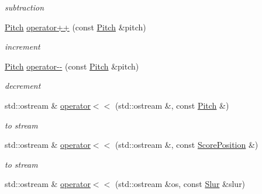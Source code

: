 \begin{DoxyCompactItemize}
\begin{DoxyCompactList}\small\item\em subtraction \end{DoxyCompactList}\item 
\hypertarget{namespacesinsy_af7621892422c95de02c6f11a01417ebd}{\hyperlink{classsinsy_1_1Pitch}{\-Pitch} \hyperlink{namespacesinsy_af7621892422c95de02c6f11a01417ebd}{operator++} (const \hyperlink{classsinsy_1_1Pitch}{\-Pitch} \&pitch)}\label{namespacesinsy_af7621892422c95de02c6f11a01417ebd}

\begin{DoxyCompactList}\small\item\em increment \end{DoxyCompactList}\item 
\hypertarget{namespacesinsy_a11990db2d25e8464b1382d470e520950}{\hyperlink{classsinsy_1_1Pitch}{\-Pitch} \hyperlink{namespacesinsy_a11990db2d25e8464b1382d470e520950}{operator-\/-\/} (const \hyperlink{classsinsy_1_1Pitch}{\-Pitch} \&pitch)}\label{namespacesinsy_a11990db2d25e8464b1382d470e520950}

\begin{DoxyCompactList}\small\item\em decrement \end{DoxyCompactList}\item 
\hypertarget{namespacesinsy_a971044ff94a29b43d5528dc2eff2e428}{std\-::ostream \& \hyperlink{namespacesinsy_a971044ff94a29b43d5528dc2eff2e428}{operator$<$$<$} (std\-::ostream \&, const \hyperlink{classsinsy_1_1Pitch}{\-Pitch} \&)}\label{namespacesinsy_a971044ff94a29b43d5528dc2eff2e428}

\begin{DoxyCompactList}\small\item\em to stream \end{DoxyCompactList}\item 
\hypertarget{namespacesinsy_a9a6f6bb3cd69764bae2883df0471742d}{std\-::ostream \& \hyperlink{namespacesinsy_a9a6f6bb3cd69764bae2883df0471742d}{operator$<$$<$} (std\-::ostream \&, const \hyperlink{classsinsy_1_1ScorePosition}{\-Score\-Position} \&)}\label{namespacesinsy_a9a6f6bb3cd69764bae2883df0471742d}

\begin{DoxyCompactList}\small\item\em to stream \end{DoxyCompactList}\item 
\hypertarget{namespacesinsy_ad5f6efd215c950a8c02c5a2dcbfe06f2}{std\-::ostream \& \hyperlink{namespacesinsy_ad5f6efd215c950a8c02c5a2dcbfe06f2}{operator$<$$<$} (std\-::ostream \&os, const \hyperlink{classsinsy_1_1Slur}{\-Slur} \&slur)}\label{namespacesinsy_ad5f6efd215c950a8c02c5a2dcbfe06f2}


\end{DoxyCompactItemize}
